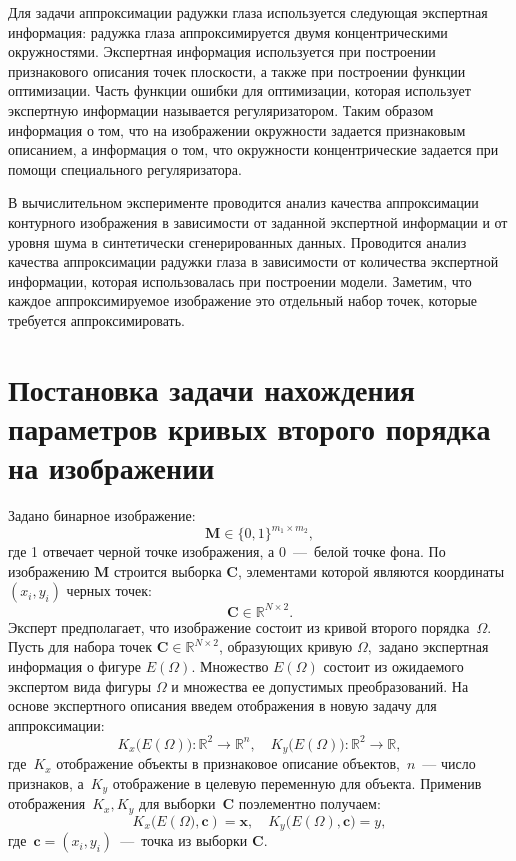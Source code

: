 \documentclass[12pt, twoside]{article}
\numberwithin{equation}{section}
\begin{document}
Для задачи аппроксимации радужки глаза используется следующая экспертная информация: радужка глаза аппроксимируется двумя концентрическими окружностями. Экспертная информация используется при построении признакового описания точек плоскости, а также при построении функции оптимизации. Часть функции ошибки для оптимизации, которая использует экспертную информации называется регуляризатором. Таким образом информация о том, что на изображении окружности задается признаковым описанием, а информация о том, что окружности концентрические задается при помощи специального регуляризатора.

В вычислительном эксперименте проводится анализ качества аппроксимации контурного изображения в зависимости от заданной экспертной информации и от уровня шума в синтетически сгенерированных данных. Проводится анализ качества аппроксимации радужки глаза в зависимости от количества экспертной информации, которая использовалась при построении модели. Заметим, что каждое аппроксимируемое изображение это отдельный набор точек, которые требуется аппроксимировать.


\section{Постановка задачи нахождения параметров кривых второго порядка на изображении}
Задано бинарное изображение:
$$ \mathbf{M} \in \{0, 1 \}^{m_1\times m_2},$$
где 1 отвечает черной точке изображения, а 0~---~белой точке фона.
По изображению $\mathbf{M}$ строится выборка $\mathbf{C}$, элементами которой являются координаты $(x_i, y_i)$ черных точек: $$\mathbf{C} \in \mathbb{R}^{N \times 2}.$$
Эксперт предполагает, что изображение состоит из кривой второго порядка~$\Omega$.
Пусть для набора точек $\mathbf{C} \in \mathbb{R}^{N \times 2}$, образующих кривую $\Omega,$ задано экспертная информация о фигуре $E(\Omega)$.
Множество $E(\Omega)$ состоит из ожидаемого экспертом вида фигуры $\Omega$ и множества ее допустимых преобразований. На основе экспертного описания введем отображения в новую задачу для аппроксимации:
\begin{equation}\label{eq1}
	K_{x}\bigl(E(\Omega)\bigr): \mathbb{R}^{2} \rightarrow \mathbb{R}^{n}, \quad K_{y}\bigl(E(\Omega)\bigr): \mathbb{R}^{2} \rightarrow \mathbb{R},
\end{equation} 
где~$K_{x}$ отображение объекты в признаковое описание объектов,~$n$~--- число признаков, а~$K_{y}$ отображение в целевую переменную для объекта. Применив отображения~$K_{x},K_{y}$ для выборки~$\mathbf{C}$ поэлементно получаем:
\begin{equation}
\label{eq2}
	K_{x}\bigl(E(\Omega\bigr), \mathbf{c}) = \mathbf{x}, \quad  K_{y}\bigl(E(\Omega), \mathbf{c}\bigr) = y,
\end{equation}
где~$\mathbf{c} = (x_i, y_i)$~---~точка из выборки $\mathbf{C}$.
\end{document}
